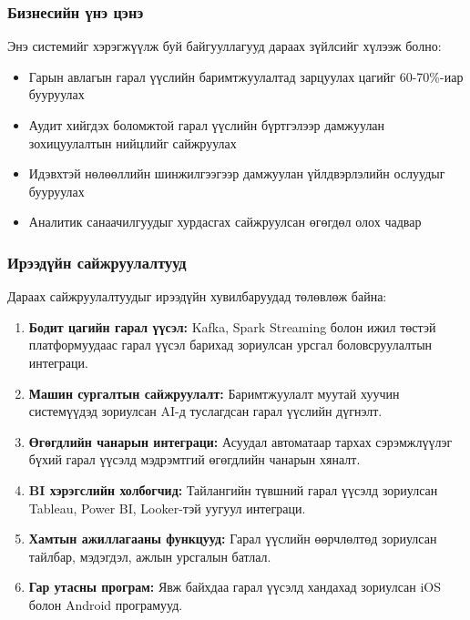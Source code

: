 \subsubsection{Бизнесийн үнэ цэнэ}

Энэ системийг хэрэгжүүлж буй байгууллагууд дараах зүйлсийг хүлээж болно:
\begin{itemize}
    \item Гарын авлагын гарал үүслийн баримтжуулалтад зарцуулах цагийг 60-70\%-иар бууруулах
    \item Аудит хийгдэх боломжтой гарал үүслийн бүртгэлээр дамжуулан зохицуулалтын нийцлийг сайжруулах
    \item Идэвхтэй нөлөөллийн шинжилгээгээр дамжуулан үйлдвэрлэлийн ослуудыг бууруулах
    \item Аналитик санаачилгуудыг хурдасгах сайжруулсан өгөгдөл олох чадвар
\end{itemize}

\subsubsection{Ирээдүйн сайжруулалтууд}

Дараах сайжруулалтуудыг ирээдүйн хувилбаруудад төлөвлөж байна:

\begin{enumerate}
    \item \textbf{Бодит цагийн гарал үүсэл:} Kafka, Spark Streaming болон ижил төстэй платформуудаас гарал үүсэл барихад зориулсан урсгал боловсруулалтын интеграци.
    
    \item \textbf{Машин сургалтын сайжруулалт:} Баримтжуулалт муутай хуучин системүүдэд зориулсан AI-д туслагдсан гарал үүслийн дүгнэлт.
    
    \item \textbf{Өгөгдлийн чанарын интеграци:} Асуудал автоматаар тархах сэрэмжлүүлэг бүхий гарал үүсэлд мэдрэмтгий өгөгдлийн чанарын хяналт.
    
    \item \textbf{BI хэрэгслийн холбогчид:} Тайлангийн түвшний гарал үүсэлд зориулсан Tableau, Power BI, Looker-тэй уугуул интеграци.
    
    \item \textbf{Хамтын ажиллагааны функцууд:} Гарал үүслийн өөрчлөлтөд зориулсан тайлбар, мэдэгдэл, ажлын урсгалын батлал.
    
    \item \textbf{Гар утасны програм:} Явж байхдаа гарал үүсэлд хандахад зориулсан iOS болон Android програмууд.
\end{enumerate}


